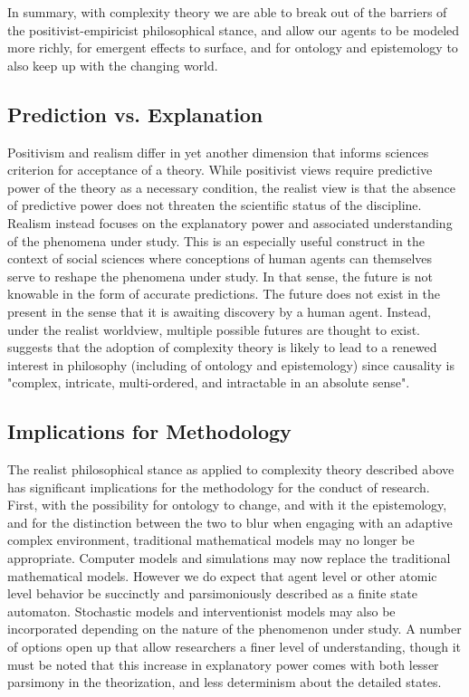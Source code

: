 \documentclass[12pt]{article}
\begin{document}
In summary, with complexity theory we are able to break out of the barriers of the positivist-empiricist philosophical stance, and allow our agents to be modeled more richly, for emergent effects to surface, and for ontology and epistemology to also keep up with the changing world.

\subsection{Prediction vs. Explanation}
Positivism and realism differ in yet another dimension that informs science\textquotesingle s criterion for acceptance of a theory. While positivist views require predictive power of the theory as a necessary condition, the realist view is that the absence of predictive power does not threaten the scientific status of the discipline. Realism instead focuses on the explanatory power and associated understanding of the phenomena under study. This is an especially useful construct in the context of social sciences where conceptions of human agents can themselves serve to reshape the phenomena under study. In that sense, the future is not knowable in the form of accurate predictions. The future does not exist in the present in the sense that it is awaiting discovery by a human agent. Instead, under the realist worldview, multiple possible futures are thought to exist. \cite{Richardson2011} suggests that the adoption of complexity theory is likely to lead to a renewed interest in philosophy (including of ontology and epistemology) since causality is "complex, intricate, multi-ordered, and intractable in an absolute sense".

\subsection{Implications for Methodology}
The realist philosophical stance as applied to complexity theory described above has significant implications for the methodology for the conduct of research. First, with the possibility for ontology to change, and with it the epistemology, and for the distinction between the two to blur when engaging with an adaptive complex environment, traditional mathematical models may no longer be appropriate. Computer models and simulations may now replace the traditional mathematical models. However we do expect that agent level or other atomic level behavior be succinctly and parsimoniously described as a finite state automaton. Stochastic models and interventionist models may also be incorporated depending on the nature of the phenomenon under study. A number of options open up that allow researchers a finer level of understanding, though it must be noted that this increase in explanatory power comes with both lesser parsimony in the theorization, and less determinism about the detailed states.
\end{document}
